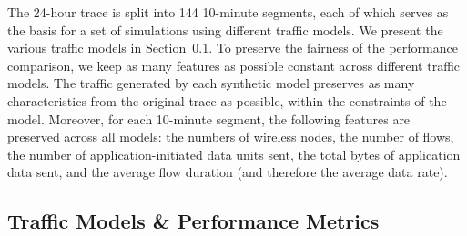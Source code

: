 \documentclass[conference]{IEEEtran}
\begin{document}
The 24-hour trace is split into 144 10-minute segments, each of which serves as the basis for a set of simulations using different traffic models. We present the various traffic models in Section~\ref{sec:models-metrics}. To preserve the fairness of the performance comparison, we keep as many features as possible constant across different traffic models. The traffic generated by each synthetic model preserves as many characteristics from the original trace as possible, within the constraints of the model. Moreover, for each 10-minute segment, the following features are preserved across all models: the numbers of wireless nodes, the number of flows, the number of application-initiated data units sent, the total bytes of application data sent, and the average flow duration (and therefore the average data rate).

\subsection{Traffic Models \& Performance Metrics}\label{sec:models-metrics}
\end{document}
